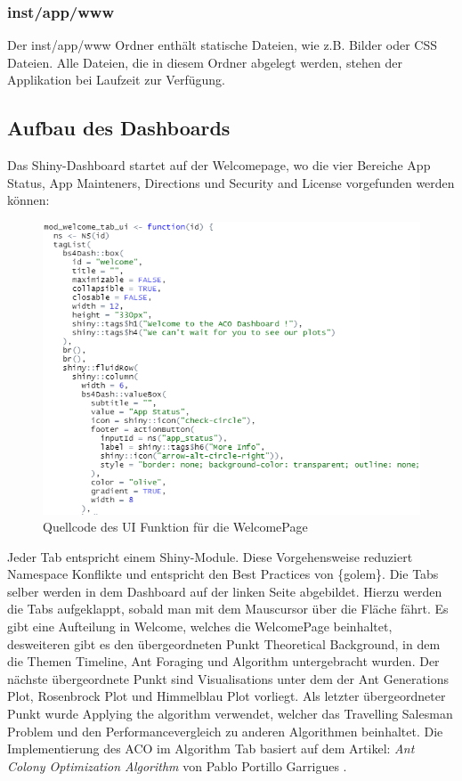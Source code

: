 \subsubsection{inst/app/www}
Der inst/app/www Ordner enthält statische Dateien, wie z.B. Bilder oder CSS Dateien. Alle Dateien, die in diesem Ordner abgelegt werden, stehen der Applikation bei Laufzeit zur Verfügung. 

\subsection{Aufbau des Dashboards}\label{chap:Aufbau}
 Das Shiny-Dashboard startet auf der Welcomepage, wo die vier Bereiche App Status, App Mainteners, Directions und Security and License vorgefunden werden können:
\begin{figure} [H]
 \centering
 \includegraphics[scale=.8]{"images/02_Aufbau_und_Organisation/ui_welcomepage.png"}
 \caption{Quellcode des UI Funktion für die WelcomePage}
 \label{fig:fluidPage}
\end{figure}

Jeder Tab entspricht einem Shiny-Module. Diese Vorgehensweise reduziert Namespace Konflikte und entspricht den Best Practices von \{golem\}.\newline
Die Tabs selber werden in dem Dashboard auf der linken Seite abgebildet. Hierzu werden die Tabs aufgeklappt, sobald man mit dem Mauscursor über die Fläche fährt. Es gibt eine Aufteilung in Welcome, welches die WelcomePage beinhaltet, desweiteren gibt es den übergeordneten Punkt Theoretical Background, in dem die Themen Timeline, Ant Foraging und Algorithm untergebracht wurden. Der nächste übergeordnete Punkt sind Visualisations unter dem der Ant Generations Plot, Rosenbrock Plot und Himmelblau Plot vorliegt. Als letzter übergeordneter Punkt wurde Applying the algorithm verwendet, welcher das Travelling Salesman Problem und den Performancevergleich zu anderen Algorithmen beinhaltet. \newline
Die Implementierung des ACO im Algorithm Tab basiert auf dem Artikel: \glqq \emph{Ant Colony Optimization Algorithm}\grqq{} von Pablo Portillo Garrigues \citep{Garrigues2019}.